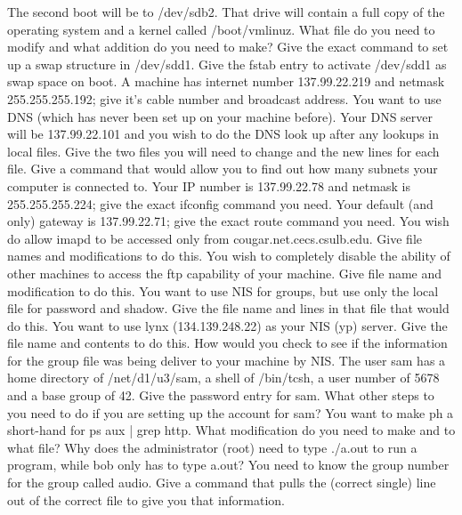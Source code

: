 The second boot will be to {\ltt{}/dev/sdb2}. That drive will contain a 
full copy of the operating system and a kernel called {\ltt{}/boot/vmlinuz}.
What file do you need to modify and what addition do you need to make?
\vskip 0.8in
\vfill\eject
\ques
Give the exact command to set up a swap structure in {\ltt{}/dev/sdd1}.
\vskip 0.4in
Give the fstab entry to activate {\ltt{}/dev/sdd1} as swap space on boot.
\vskip 0.6in
\ques
A machine has internet number {\ltt{}137.99.22.219} and
netmask {\ltt{}255.255.255.192}; give it's cable number and broadcast address.
\vskip 1.0in
You want to use DNS (which has never been set up on your machine before).
Your DNS server will be {\ltt{}137.99.22.101} and you wish to do the DNS
look up after any lookups in local files.
Give the two files you will need to change and the new lines for each file.
\vskip 0.8in
Give a command that would allow you to find out how many subnets your
computer is connected to.
\vskip 0.4in
\ques
Your IP number is {\ltt{}137.99.22.78} and netmask is {\ltt{}255.255.255.224};
give the exact {\ltt{}ifconfig} command you need.
\vskip 0.4in
Your default (and only) gateway is {\ltt{}137.99.22.71};
give the exact {\ltt{}route} command you need.
\vskip 0.4in
You wish do allow {\ltt{}imapd} to be accessed only from
{\ltt{}cougar.net.cecs.csulb.edu}.
Give file names and modifications to do this.
\vskip 1.4in
You wish to completely disable the ability of other machines to 
access the {\ltt{}ftp} capability of your machine.
Give file name and modification to do this.
\vskip 0.8in
\vfill\eject
\ques
You want to use NIS for groups, but use only the
local file for password and shadow.
Give the file name and lines in that file that would do this.
\vskip 0.6in
You want to use {\ltt{}lynx} ({\ltt{}134.139.248.22}) as your
NIS (yp) server.
Give the file name and contents to do this.
\vskip 0.6in
How would you check to see if the information for the {\ltt{}group} file
was being deliver to your machine by NIS.
\vskip 0.4in
\ques
The user {\ltt{}sam} has  a home directory of {\ltt{}/net/d1/u3/sam},
a shell of {\ltt{}/bin/tcsh}, a user number of {\ltt{}5678}
and a base group of {\ltt{}42}.
Give the password entry for {\ltt{}sam}.
\vskip 0.4in
What other steps to you need to do if you are setting up the
account for {\ltt{}sam}?
\vskip 1.2in
\ques
You want to make {\ltt{}ph} a short-hand for {\ltt{}ps aux | grep http}.
What modification do you need to make and to what file?
\vskip 0.9in
Why does the administrator ({\ltt{}root}) need to type {\ltt{}./a.out}
to run a program, while {\ltt{}bob} only has to type {\ltt{}a.out}?
\vskip 1.0in
You need to know the group number for the group called {\ltt{}audio}.
Give a command that pulls the (correct single) line out of the correct file
to give you that information.
\vskip 0.9in
\bye
